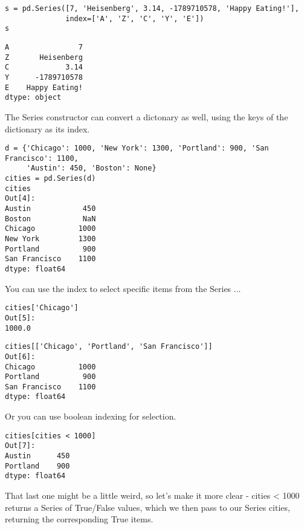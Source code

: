 \documentclass[KSmain.tex]{subfiles}
\begin{document}
\begin{framed}
\begin{verbatim}
s = pd.Series([7, 'Heisenberg', 3.14, -1789710578, 'Happy Eating!'],
              index=['A', 'Z', 'C', 'Y', 'E'])
s
\end{verbatim}
\end{framed}
\begin{verbatim}
A                7
Z       Heisenberg
C             3.14
Y      -1789710578
E    Happy Eating!
dtype: object
\end{verbatim}

The Series constructor can convert a dictonary as well, using the keys of the dictionary as its index.

\begin{framed}
\begin{verbatim}
d = {'Chicago': 1000, 'New York': 1300, 'Portland': 900, 'San Francisco': 1100,
     'Austin': 450, 'Boston': None}
cities = pd.Series(d)
cities
Out[4]:
Austin            450
Boston            NaN
Chicago          1000
New York         1300
Portland          900
San Francisco    1100
dtype: float64
\end{verbatim}
\end{framed}
You can use the index to select specific items from the Series ...

\begin{framed}
\begin{verbatim}
cities['Chicago']
Out[5]:
1000.0
\end{verbatim}
\end{framed}

\begin{framed}
\begin{verbatim}
cities[['Chicago', 'Portland', 'San Francisco']]
Out[6]:
Chicago          1000
Portland          900
San Francisco    1100
dtype: float64
\end{verbatim}
\end{framed}
Or you can use boolean indexing for selection.

\begin{framed}
\begin{verbatim}
cities[cities < 1000]
Out[7]:
Austin      450
Portland    900
dtype: float64
\end{verbatim}
\end{framed}
That last one might be a little weird, so let's make it more clear - cities < 1000 returns a Series of True/False values, which we then pass to our Series cities, returning the corresponding True items.
\end{document}
